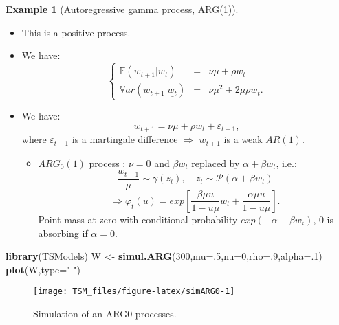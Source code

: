 \documentclass[
  12pt,
]{book}
\newenvironment{Shaded}{\begin{snugshade}}{\end{snugshade}}
\newcommand{\AttributeTok}[1]{\textcolor[rgb]{0.13,0.29,0.53}{#1}}
\newcommand{\DecValTok}[1]{\textcolor[rgb]{0.00,0.00,0.81}{#1}}
\newcommand{\FunctionTok}[1]{\textcolor[rgb]{0.13,0.29,0.53}{\textbf{#1}}}
\newcommand{\NormalTok}[1]{#1}
\newcommand{\OtherTok}[1]{\textcolor[rgb]{0.56,0.35,0.01}{#1}}
\newcommand{\StringTok}[1]{\textcolor[rgb]{0.31,0.60,0.02}{#1}}
\providecommand{\tightlist}{%
  \setlength{\itemsep}{0pt}\setlength{\parskip}{0pt}}
\theoremstyle{definition}
\theoremstyle{definition}
\newtheorem{example}{Example}[chapter]
\theoremstyle{definition}
\theoremstyle{definition}
\theoremstyle{remark}
\begin{document}
\begin{example}[Autoregressive gamma process, ARG(1)]
\begin{itemize}
\tightlist
\item
  This is a positive process.
\item
  We have:
  \[
    \left\{
    \begin{array}{ccc}
    \mathbb{E}(w_{t+1}|\underline{w_t}) &=& \nu \mu + \rho w_t \\
    \mathbb{V}ar(w_{t+1}|\underline{w_t}) &=& \nu \mu^2 + 2 \mu \rho w_t.
    \end{array}
    \right.
    \]
\item
  We have:
  \[
    w_{t+1}=\nu\mu+\rho w_t+\varepsilon_{t+1},
    \]
  where \(\varepsilon_{t+1}\) is a martingale difference \(\Rightarrow\) \(w_{t+1}\) is a weak \(AR(1)\).

  \begin{itemize}
  \tightlist
  \item
    \(ARG_0(1)\) process \citep{zarg_2017}: \(\nu = 0\) and \(\beta w_t\) replaced by \(\alpha + \beta w_t\), i.e.:
    \begin{equation}
      \frac{w_{t+1}}{\mu} \sim \gamma(z_t),\quad z_t \sim {\mathcal{P}}(\alpha + \beta w_t)\label{eq:ARG0}
      \end{equation}
    \[
      \Rightarrow \varphi_t(u) = exp \left[\frac{\beta \mu u}{1-u \mu} w_t + \frac{\alpha \mu u}{1-u \mu}
    \right].
    \]
    Point mass at zero with conditional probability \(exp(-\alpha - \beta w_t)\), 0 is absorbing if \(\alpha = 0\).
  \end{itemize}
\end{itemize}

\begin{Shaded}
\begin{Highlighting}[]
\FunctionTok{library}\NormalTok{(TSModels)}
\NormalTok{W }\OtherTok{\textless{}{-}} \FunctionTok{simul.ARG}\NormalTok{(}\DecValTok{300}\NormalTok{,}\AttributeTok{mu=}\NormalTok{.}\DecValTok{5}\NormalTok{,}\AttributeTok{nu=}\DecValTok{0}\NormalTok{,}\AttributeTok{rho=}\NormalTok{.}\DecValTok{9}\NormalTok{,}\AttributeTok{alpha=}\NormalTok{.}\DecValTok{1}\NormalTok{)}
\FunctionTok{plot}\NormalTok{(W,}\AttributeTok{type=}\StringTok{"l"}\NormalTok{)}
\end{Highlighting}
\end{Shaded}

\begin{figure}
\texttt{[image: TSM\_files/figure-latex/simARG0-1]} \caption{Simulation of an ARG0 processes.}\label{fig:simARG0}
\end{figure}

\end{example}
\end{document}
